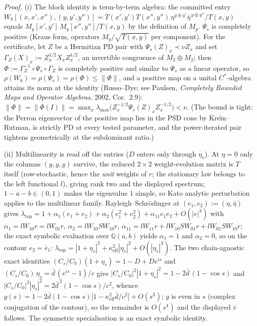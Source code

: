 \documentclass[
]{article}
\begin{document}
\emph{Proof.} (i) The block identity is term-by-term algebra: the committed
entry $W_8[(x,x',x''),(y,y',y'')]=T(x',y')T(x'',y'')\,
\eta^{y\oplus y'}\bar\eta^{\,y\oplus y''}/T(x,y)$ equals
$M_y[x',y']\,\overline{M_y[x'',y'']}/T(x,y)$ by the definition of $M_y$.
$\Psi_s$ is completely positive (Kraus form, operators
$M_y/\sqrt{T(x,y)}$ per component). For the certificate, let $Z$ be a
Hermitian PD pair with $\Psi_s(Z)_x\prec\nu Z_x$ and set
$\Gamma_Z(X)_x:=Z_x^{1/2}X_xZ_x^{1/2}$, an invertible congruence of
$M_2\oplus M_2$; then $\Phi:=\Gamma_Z^{-1}\circ\Psi_s\circ\Gamma_Z$ is
completely positive and similar to $\Psi_s$ as a linear operator, so
$\rho(W_8)=\rho(\Psi_s)=\rho(\Phi)\le\|\Phi\|$, and a positive map on a
unital $C^*$-algebra attains its norm at the identity (Russo--Dye; see
Paulsen, \emph{Completely Bounded Maps and Operator Algebras}, 2002,
Cor.~2.9): $\|\Phi\|=\|\Phi(I)\|=\max_x\lambda_{\max}\bigl(Z_x^{-1/2}
\Psi_s(Z)_xZ_x^{-1/2}\bigr)<\nu$. (The bound is tight: the Perron
eigenvector of the positive map lies in the PSD cone by Kre\u{\i}n--Rutman,
is strictly PD at every tested parameter, and the power-iterated pair
tightens geometrically at the subdominant ratio.)

(ii) Multilinearity is read off the entries ($D$ enters only through
$\eta_s$). At $\eta=0$ only the columns $(y,y,y)$ survive, the reduced
$2\times2$ weight-evolution matrix is $T$ itself (row-stochastic, hence the
\emph{unit} weights of $r$; the stationary law belongs to the left
functional $l$), giving rank two and the displayed spectrum; $1-a-b\in(0,1)$
makes the eigenvalue $1$ simple, so Kato analytic perturbation applies to
the multilinear family. Rayleigh--Schr\"odinger at $(e_1,e_2):=(\eta,\bar\eta)$
gives $\lambda_{\mathrm{top}}=1+\alpha_1(e_1+e_2)+\alpha_2(e_1^2+e_2^2)
+\alpha_{11}e_1e_2+O(|e|^3)$ with $\alpha_1=lW_{10}r=lW_{01}r$,
$\alpha_2=lW_{10}SW_{10}r$, $\alpha_{11}=lW_{11}r+lW_{10}SW_{01}r
+lW_{01}SW_{10}r$; the exact symbolic evaluation over $\mathbb Q(a,b)$
yields $\alpha_1=1$ and $\alpha_2=0$, so on the contour $e_2=\bar e_1$:
$\lambda_{\mathrm{top}}=|1+\eta_s|^2+\kappa_{\mathrm{eff}}^2|\eta_s|^2
+O(|\eta_s|^3)$. The two chain-agnostic exact identities
$(C_s/C_0)(1+\eta_s)=1-D+De^{is}$ and $(C_s/C_0)\,\eta_s=\bar d\,(e^{is}-1)/c$
give $|C_s/C_0|^2|1+\eta_s|^2=1-2\bar d\,(1-\cos s)$ and
$|C_s/C_0|^2|\eta_s|^2=2\bar d^{\,2}(1-\cos s)/c^2$, whence
$g(s)=1-2\bar d(1-\cos s)\bigl[1-\kappa_{\mathrm{eff}}^2\bar d/c^2\bigr]
+O(s^3)$; $g$ is even in $s$ (complex conjugation of the contour), so the
remainder is $O(s^4)$ and the displayed $\bar v$ follows. The symmetric
specialisation is an exact symbolic identity.
\end{document}
